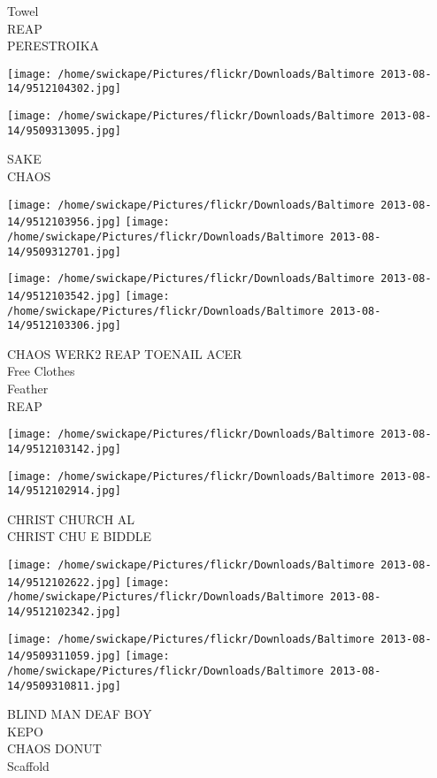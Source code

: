 \documentclass[10pt,letterpaper]{article}
\begin{document}
Towel\\
REAP\\
PERESTROIKA
\pagebreak

\texttt{[image: /home/swickape/Pictures/flickr/Downloads/Baltimore 2013-08-14/9512104302.jpg]}

\vspace{0.25in}
\texttt{[image: /home/swickape/Pictures/flickr/Downloads/Baltimore 2013-08-14/9509313095.jpg]}

SAKE\\
CHAOS
\pagebreak

\texttt{[image: /home/swickape/Pictures/flickr/Downloads/Baltimore 2013-08-14/9512103956.jpg]}
\texttt{[image: /home/swickape/Pictures/flickr/Downloads/Baltimore 2013-08-14/9509312701.jpg]}

\texttt{[image: /home/swickape/Pictures/flickr/Downloads/Baltimore 2013-08-14/9512103542.jpg]}
\texttt{[image: /home/swickape/Pictures/flickr/Downloads/Baltimore 2013-08-14/9512103306.jpg]}

CHAOS WERK2 REAP TOENAIL ACER\\
Free Clothes\\
Feather\\
REAP
\pagebreak

\texttt{[image: /home/swickape/Pictures/flickr/Downloads/Baltimore 2013-08-14/9512103142.jpg]}

\vspace{0.25in}
\texttt{[image: /home/swickape/Pictures/flickr/Downloads/Baltimore 2013-08-14/9512102914.jpg]}

CHRIST CHURCH AL\\
CHRIST CHU E BIDDLE
\pagebreak

\texttt{[image: /home/swickape/Pictures/flickr/Downloads/Baltimore 2013-08-14/9512102622.jpg]}
\texttt{[image: /home/swickape/Pictures/flickr/Downloads/Baltimore 2013-08-14/9512102342.jpg]}

\texttt{[image: /home/swickape/Pictures/flickr/Downloads/Baltimore 2013-08-14/9509311059.jpg]}
\texttt{[image: /home/swickape/Pictures/flickr/Downloads/Baltimore 2013-08-14/9509310811.jpg]}

BLIND MAN DEAF BOY\\
KEPO\\
CHAOS DONUT\\
Scaffold
\pagebreak
\end{document}
